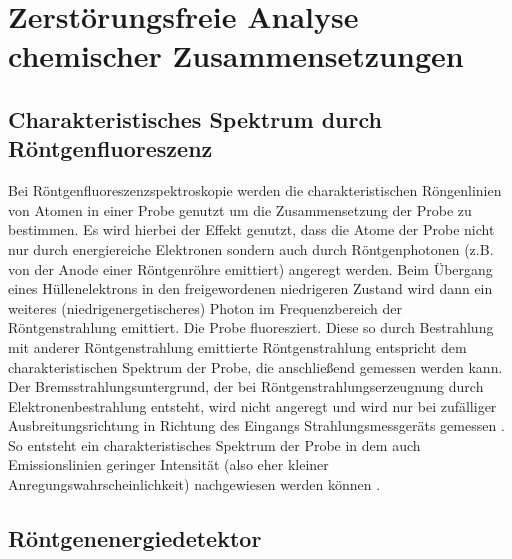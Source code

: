 \chapter{Zerstörungsfreie Analyse chemischer Zusammensetzungen}

\section{Charakteristisches Spektrum durch Röntgenfluoreszenz}

Bei Röntgenfluoreszenzspektroskopie werden die charakteristischen Röngenlinien von Atomen in einer Probe genutzt um die Zusammensetzung der Probe zu bestimmen.
Es wird hierbei der Effekt genutzt, dass die Atome der Probe nicht nur durch energiereiche Elektronen sondern auch durch Röntgenphotonen (z.B. von der Anode einer Röntgenröhre emittiert) angeregt werden. Beim Übergang eines Hüllenelektrons in den freigewordenen niedrigeren Zustand wird dann ein weiteres (niedrigenergetischeres) Photon im Frequenzbereich der Röntgenstrahlung emittiert. Die Probe fluoresziert. Diese so durch Bestrahlung mit anderer Röntgenstrahlung emittierte Röntgenstrahlung entspricht dem charakteristischen Spektrum der Probe, die anschließend gemessen werden kann. Der Bremsstrahlungsuntergrund, der bei Röntgenstrahlungserzeugnung durch Elektronenbestrahlung entsteht, wird nicht angeregt und wird nur bei zufälliger Ausbreitungsrichtung in Richtung des Eingangs Strahlungsmessgeräts gemessen \cite[261]{Demtroeder3}. So entsteht ein charakteristisches Spektrum der Probe in dem auch Emissionslinien geringer Intensität (also eher kleiner Anregungswahrscheinlichkeit) nachgewiesen werden können \cite{LDfluoreszenz}.

\section{Röntgenenergiedetektor}

